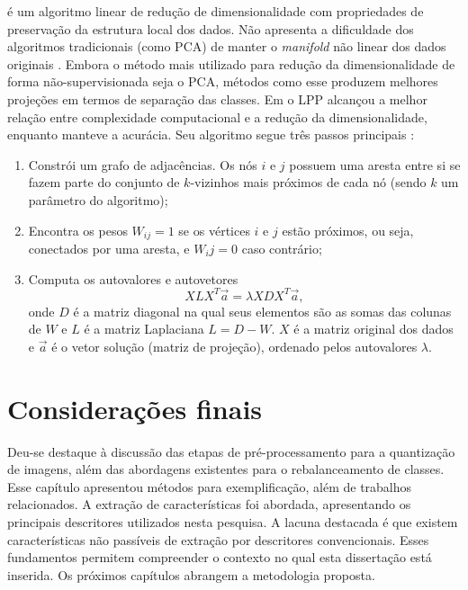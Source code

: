  é um algoritmo linear de redução de dimensionalidade com propriedades de preservação da estrutura local dos dados. Não apresenta a dificuldade dos algoritmos tradicionais (como PCA) de manter o \textit{manifold} não linear dos dados originais \cite{Zhuo2014}. Embora o método mais utilizado para redução da dimensionalidade de forma não-supervisionada seja o PCA, métodos como esse produzem melhores projeções em termos de separação das classes. Em  o LPP alcançou a melhor relação entre complexidade computacional e a redução da dimensionalidade, enquanto manteve a acurácia. Seu algoritmo segue três passos principais \cite{He2004}:

\begin{enumerate}
\item Constrói um grafo de adjacências. Os nós $i$ e $j$ possuem uma aresta entre si se fazem parte do conjunto de $k$-vizinhos mais próximos de cada nó (sendo $k$ um parâmetro do algoritmo);

\item Encontra os pesos $W_{ij} = 1$ se os vértices $i$ e $j$ estão próximos, ou seja, conectados por uma aresta, e $W_ij = 0$ caso contrário;

\item Computa os autovalores e autovetores
\begin{equation}
    X L X^T \vec{a} = \lambda X D X^T \vec{a},
\end{equation}
\noindent onde $D$ é a matriz diagonal na qual seus elementos são as somas das colunas de $W$ e $L$ é a matriz Laplaciana $L = D - W$. $X$ é a matriz original dos dados e $\vec{a}$ é o vetor solução (matriz de projeção), ordenado pelos autovalores $\lambda$.
\end{enumerate}


\section{Considerações finais}

Deu-se destaque à discussão das etapas de pré-processamento para a quantização de imagens, além das abordagens existentes para o rebalanceamento de classes. Esse capítulo apresentou métodos para exemplificação, além de trabalhos relacionados. A extração de características foi abordada, apresentando os principais descritores utilizados nesta pesquisa. A lacuna destacada é que existem características não passíveis de extração por descritores convencionais. Esses fundamentos permitem compreender o contexto no qual esta dissertação está inserida. Os próximos capítulos abrangem a metodologia proposta.


